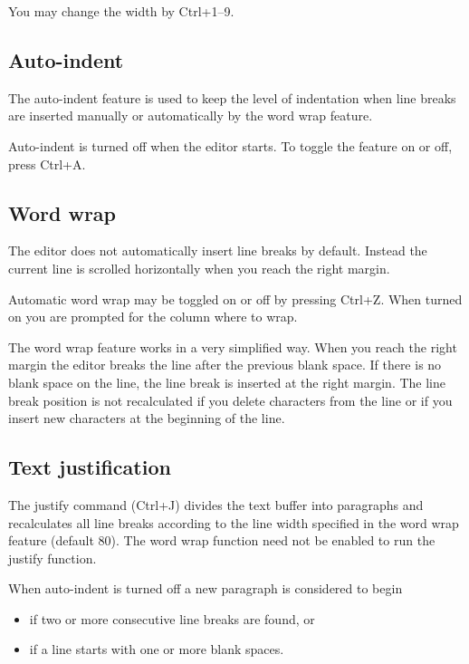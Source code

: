 \documentclass{article}
\begin{document}
        You may change the width by Ctrl+1--9.
                
    \subsection{Auto-indent}
        The auto-indent feature is used to keep the level of indentation when line breaks are inserted manually or automatically by
        the word wrap feature.

        Auto-indent is turned off when the editor starts. To toggle the feature on or off, press Ctrl+A.

    \subsection{Word wrap}
        The editor does not automatically insert line breaks by default. Instead the current line is scrolled horizontally
        when you reach the right margin.

        Automatic word wrap may be toggled on or off by pressing Ctrl+Z. When turned on you are prompted for the column
        where to wrap.

        The word wrap feature works in a very simplified way. When you reach the right margin the editor breaks the
        line after the previous blank space. If there is no blank space on the line, the line break is inserted
        at the right margin. The line break position is not recalculated if you delete characters from the line
        or if you insert new characters at the beginning of the line.

    \subsection{Text justification}
        The justify command (Ctrl+J) divides the text buffer into paragraphs and recalculates all line breaks
        according to the line width specified in the word wrap feature (default 80). The word wrap function 
        need not be enabled to run the justify function.
          
        When auto-indent is turned off a new paragraph is considered to begin

        \begin{itemize}
            \item if two or more consecutive line breaks are found, or
            \item if a line starts with one or more blank spaces.
        \end{itemize}
\end{document}
